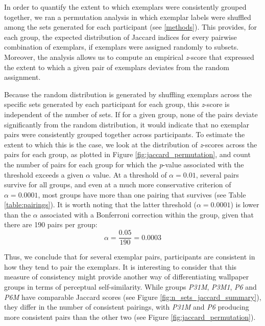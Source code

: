 \documentclass[symmetry,article,accept,pdftex,moreauthors]{Definitions/mdpi}
\begin{document}
In order to quantify the extent to which exemplars were consistently grouped together, we ran a permutation analysis in which exemplar labels were shuffled among the sets generated for each participant (see \ref{methods}). This provides, for each group, the expected distribution of Jaccard indices for every pairwise combination of exemplars, if exemplars were assigned randomly to subsets. Moreover, the analysis allows us to compute an empirical \textit{z}-score that expressed the extent to which a given pair of exemplars deviates from the random assignment. 

Because the random distribution is generated by shuffling exemplars across the specific sets generated by each participant for each group, this \textit{z}-score is independent of the number of sets. If for a given group, none of the pairs deviate significantly from the random distribution, it would indicate that no exemplar pairs were consistently grouped together across participants. To estimate the extent to which this is the case, we look at the distribution of \textit{z}-scores across the pairs for each group, as plotted in Figure \ref{fig:jaccard_permutation}, and count the number of pairs for each group for which the \textit{p}-value associated with the threshold exceeds a given $\alpha$ value. At a threshold of $\alpha = 0.01$, several pairs survive for all groups, and even at a much more conservative criterion of $\alpha = 0.0001$, most groups have more than one pairing that survives (see Table \ref{table:pairings}). It is worth noting that the latter threshold ($\alpha = 0.0001$) is lower than the $\alpha$ associated with a Bonferroni correction within the group, given that there are 190 pairs per group: \[ \alpha = \frac{0.05}{190} = 0.0003 \] 

Thus, we conclude that for several exemplar pairs, participants are consistent in how they tend to pair the exemplars. It is interesting to consider that this measure of consistency might provide another way of differentiating wallpaper groups in terms of perceptual self-similarity. While groups \textit{P31M}, \textit{P3M1}, \textit{P6} and \textit{P6M} have comparable Jaccard scores (see Figure \ref{fig:n_sets_jaccard_summary}), they differ in the number of consistent pairings, with \textit{P31M} and \textit{P6} producing more consistent pairs than the other two (see Figure \ref{fig:jaccard_permutation}). 
\end{document}

